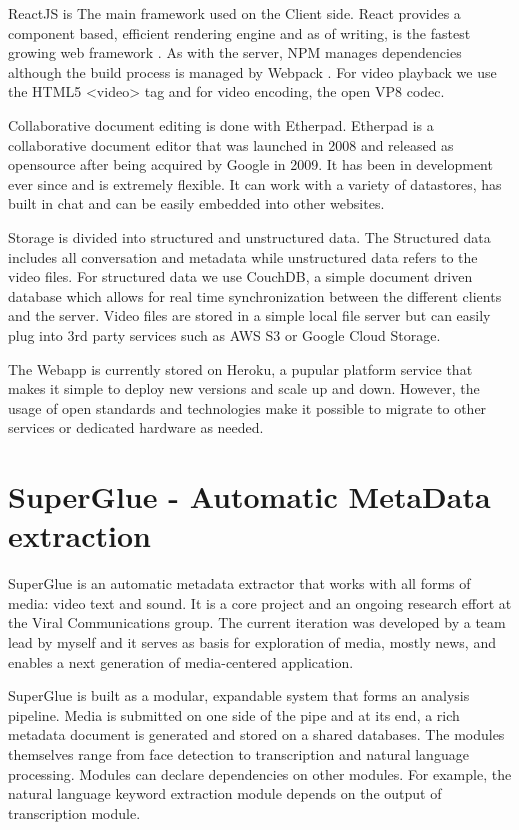 ReactJS is The main framework used on the Client side. React provides a component based, efficient rendering engine and as of writing, is the fastest growing web framework \cite{reactjs}. As with the server, NPM manages dependencies although the build process is managed by Webpack \cite{webpack}. For video playback we use the HTML5 <video> tag and for video encoding, the open VP8\cite{vp8} codec. 

Collaborative document editing is done with Etherpad\cite{etherpad}. Etherpad is a collaborative document editor that was launched in 2008 and released as opensource after being acquired by Google in 2009. It has been in development ever since and is extremely flexible. It can work with a variety of datastores, has built in chat and can be easily embedded into other websites.

Storage is divided into structured and unstructured data. The Structured data includes all conversation and metadata while unstructured data refers to the video files. For structured data we use CouchDB\cite{couchdb}, a simple document driven database which allows for real time synchronization between the different clients and the server.  Video files are stored in a simple local file server but can easily plug into 3rd party services such as AWS S3 or Google Cloud Storage.

The Webapp is currently stored on Heroku\cite{heroku}, a pupular platform service that makes it simple to deploy new versions and scale up and down. However, the usage of open standards and technologies make it possible to migrate to other services or dedicated hardware as needed. 

\section{SuperGlue - Automatic MetaData extraction}
SuperGlue is an automatic metadata extractor that works with all forms of media: video text and sound. It is a core project and an ongoing research effort at the Viral Communications group. The current iteration was developed by a team lead by myself and it serves as basis for exploration of media, mostly news, and enables a next generation of media-centered application.

SuperGlue is built as a modular, expandable system that forms an analysis pipeline. Media is submitted on one side of the pipe and at its end, a rich metadata document is generated and stored on a shared databases. The modules themselves range from face detection to transcription and natural language processing. Modules can declare dependencies on other modules. For example, the natural language keyword extraction module depends on the output of transcription module.

